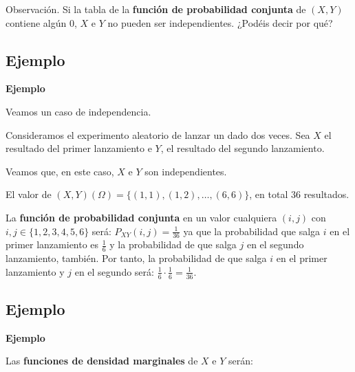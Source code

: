 \documentclass[]{book}
\begin{document}
Observación.
Si la tabla de la \textbf{función de probabilidad conjunta} de \((X,Y)\) contiene algún \(0\), \(X\) e \(Y\) no pueden ser independientes. ¿Podéis decir por qué?

\hypertarget{ejemplo-56}{%
\subsection{Ejemplo}\label{ejemplo-56}}

\textbf{Ejemplo}

Veamos un caso de independencia.

Consideramos el experimento aleatorio de lanzar un dado dos veces. Sea \(X\) el resultado del primer lanzamiento e \(Y\), el resultado del segundo lanzamiento.

Veamos que, en este caso, \(X\) e \(Y\) son independientes.

El valor de \((X,Y)(\Omega)=\{(1,1),(1,2),\ldots,(6,6)\}\), en total 36 resultados.

La \textbf{función de probabilidad conjunta} en un valor cualquiera \((i,j)\) con \(i,j\in\{1,2,3,4,5,6\}\) será:
\(P_{XY}(i,j)=\frac{1}{36}\) ya que la probabilidad que salga \(i\) en el primer lanzamiento es \(\frac{1}{6}\) y la probabilidad de que salga \(j\) en el segundo lanzamiento, también. Por tanto, la probabilidad de que salga \(i\) en el primer lanzamiento y \(j\) en el segundo será: \(\frac{1}{6}\cdot \frac{1}{6}=\frac{1}{36}.\)

\hypertarget{ejemplo-57}{%
\subsection{Ejemplo}\label{ejemplo-57}}

\textbf{Ejemplo}

Las \textbf{funciones de densidad marginales} de \(X\) e \(Y\) serán:
\end{document}
